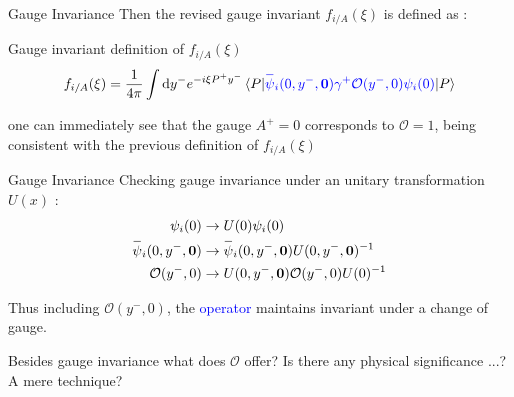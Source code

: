 \documentclass[aspectratio=169,xcolor=dvipsnames]{beamer}
\newcommand{\overbar}[1]{
	\mkern 1.5mu \overline{\mkern-1.5mu\raisebox{0pt}[\dimexpr\height+0.5mm\relax]{$#1$}\mkern-1.5mu}\mkern 1.5mu
}
\newcommand*\dif{\mathop{}\!\mathrm{d}}
\begin{document}
\begin{frame}{Gauge Invariance}
	Then the revised gauge invariant $f_{i/A}(\xi)$ is defined as :\vskip0.1in
	\begin{block}{Gauge invariant definition of $f_{i/A}(\xi)$}
		\begin{align*}
		f_{i/A}(\xi) = \frac{1}{4\pi} \int \dif y^- e^{-i\xi P^+ y^-} \braket{P|\begingroup \color{blue} \overbar{\psi}_i(0,y^-,\mathbf{0})\gamma^+\mathcal{O}(y^-,0)\psi_i(0)\endgroup|P}\\
		\end{align*}
	\end{block}\vskip0.15in

	one can immediately see that the gauge $A^+=0$ corresponds to $\mathcal{O}=1$, being consistent with the previous definition of $f_{i/A}(\xi)$
\end{frame}

\begin{frame}{Gauge Invariance}
	Checking gauge invariance under an unitary transformation $U(x)$ : 
	\begin{align*}
		\psi_i(0) &\to U(0)\psi_i(0) \\
		\overbar{\psi}_i(0,y^-,\mathbf{0}) &\to \overbar{\psi}_i(0,y^-,\mathbf{0}) U(0,y^-,\mathbf{0})^{-1} \\
		\mathcal{O}(y^-,0) &\to U(0,y^-,\mathbf{0})\mathcal{O}(y^-,0) U(0)^{-1}
	\end{align*}
	
	Thus including $\mathcal{O}(y^-,0)$, the \textcolor{blue}{operator} maintains invariant under a change of gauge. \vskip0.15in
	
	Besides gauge invariance what does $\mathcal{O}$ offer? Is there any physical significance ...? A mere technique?
\end{frame}
\end{document}

